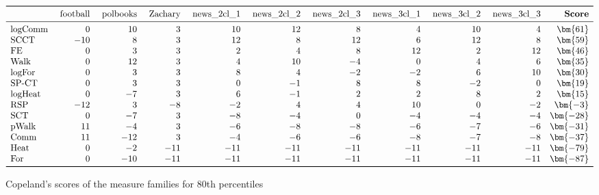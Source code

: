 \documentclass{article}
\begin{document}
\begin{table}[H] %
	\begin{minipage}{.99\textwidth}
		\centering
		$$\begin{array}{lrrrrrrrrrr}
			\toprule
            &\text{ football}&\text{ polbooks}&\text{ Zachary}&\text{ news\_2cl\_1}&\text{ news\_2cl\_2}&
            \text{ news\_2cl\_3}&\text{ news\_3cl\_1}&\text{ news\_3cl\_2}&\text{ news\_3cl\_3}&\textbf{ Score}\\
			\midrule
        \mbox{logComm} &   0 &  10 &   3 &  10 & 12 &  8 &   4 &  10 &   4 & \bm{61}\\
        \mbox{SCCT}    & -10 &   8 &   3 &  12 &  8 & 12 &   6 &  12 &   8 & \bm{59}\\
        \mbox{FE}      &   0 &   3 &   3 &   2 &  4 &  8 &  12 &   2 &  12 & \bm{46}\\
        \mbox{Walk}    &   0 &  12 &   3 &   4 & 10 & -4 &   0 &   4 &   6 & \bm{35}\\
        \mbox{logFor}  &   0 &   3 &   3 &   8 &  4 & -2 &  -2 &   6 &  10 & \bm{30}\\
        \mbox{SP-CT}   &   0 &   3 &   3 &   0 & -1 &  8 &   8 &  -2 &   0 & \bm{19}\\
        \mbox{logHeat} &   0 &  -7 &   3 &   6 & -1 &  2 &   2 &   8 &   2 & \bm{15}\\
        \mbox{RSP}     & -12 &   3 &  -8 &  -2 &  4 &  4 &  10 &   0 &  -2 & \bm{-3}\\
        \mbox{SCT}     &   0 &  -7 &   3 &  -8 & -4 &  0 &  -4 &  -4 &  -4 & \bm{-28}\\
        \mbox{pWalk}   &  11 &  -4 &   3 &  -6 & -8 & -8 &  -6 &  -7 &  -6 & \bm{-31}\\
        \mbox{Comm}    &  11 & -12 &   3 &  -4 & -6 & -6 &  -8 &  -7 &  -8 & \bm{-37}\\
        \mbox{Heat}    &   0 &  -2 & -11 & -11 &-11 &-11 & -11 & -11 & -11 & \bm{-79}\\
        \mbox{For}     &   0 & -10 & -11 & -11 &-11 &-11 & -11 & -11 & -11 & \bm{-87}\\			
        \bottomrule
		\end{array}$$
	\end{minipage}
	\caption{\label{t_CopComp3}Copeland's scores of the measure families for 80th percentiles}
\end{table}
\end{document}
